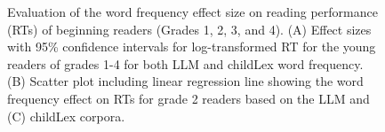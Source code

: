 \documentclass[manuscript]{stjour}
\begin{document}
\begin{figure}[!htbp]
    \centering
    \caption{Evaluation of the word frequency effect size on reading performance (RTs) of beginning readers (Grades 1, 2, 3, and 4). (A) Effect sizes with 95\% confidence intervals for log-transformed RT for the young readers of grades 1-4 for both LLM and childLex word frequency. (B) Scatter plot including linear regression line showing the word frequency effect on RTs for grade 2 readers based on the LLM and (C) childLex corpora.}
\label{fig:ef_size}
\end{figure}

\end{document}
